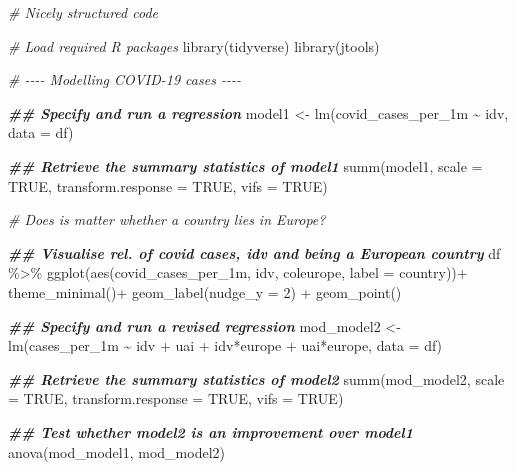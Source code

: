\documentclass[
]{book}
\newenvironment{Shaded}{\begin{snugshade}}{\end{snugshade}}
\newcommand{\AttributeTok}[1]{\textcolor[rgb]{0.77,0.63,0.00}{#1}}
\newcommand{\CommentTok}[1]{\textcolor[rgb]{0.56,0.35,0.01}{\textit{#1}}}
\newcommand{\ConstantTok}[1]{\textcolor[rgb]{0.00,0.00,0.00}{#1}}
\newcommand{\DecValTok}[1]{\textcolor[rgb]{0.00,0.00,0.81}{#1}}
\newcommand{\DocumentationTok}[1]{\textcolor[rgb]{0.56,0.35,0.01}{\textbf{\textit{#1}}}}
\newcommand{\FunctionTok}[1]{\textcolor[rgb]{0.00,0.00,0.00}{#1}}
\newcommand{\NormalTok}[1]{#1}
\newcommand{\OtherTok}[1]{\textcolor[rgb]{0.56,0.35,0.01}{#1}}
\newcommand{\SpecialCharTok}[1]{\textcolor[rgb]{0.00,0.00,0.00}{#1}}
\begin{document}
\begin{Shaded}
\begin{Highlighting}[]
\CommentTok{\# Nicely structured code}

\CommentTok{\# Load required R packages}
\FunctionTok{library}\NormalTok{(tidyverse)}
\FunctionTok{library}\NormalTok{(jtools)}

\CommentTok{\# {-}{-}{-}{-} Modelling COVID{-}19 cases {-}{-}{-}{-}}

\DocumentationTok{\#\# Specify and run a regression}
\NormalTok{model1 }\OtherTok{\textless{}{-}} \FunctionTok{lm}\NormalTok{(covid\_cases\_per\_1m }\SpecialCharTok{\textasciitilde{}}\NormalTok{ idv, }\AttributeTok{data =}\NormalTok{ df)}

\DocumentationTok{\#\# Retrieve the summary statistics of model1}
\FunctionTok{summ}\NormalTok{(model1, }\AttributeTok{scale =} \ConstantTok{TRUE}\NormalTok{, }\AttributeTok{transform.response =} \ConstantTok{TRUE}\NormalTok{, }\AttributeTok{vifs =} \ConstantTok{TRUE}\NormalTok{)}

\CommentTok{\# Does is matter whether a country lies in Europe?}

\DocumentationTok{\#\# Visualise rel. of covid cases, idv and being a European country}
\NormalTok{df }\SpecialCharTok{\%\textgreater{}\%}
  \FunctionTok{ggplot}\NormalTok{(}\FunctionTok{aes}\NormalTok{(covid\_cases\_per\_1m, idv, coleurope, }\AttributeTok{label =}\NormalTok{ country))}\SpecialCharTok{+}
  \FunctionTok{theme\_minimal}\NormalTok{()}\SpecialCharTok{+}
  \FunctionTok{geom\_label}\NormalTok{(}\AttributeTok{nudge\_y =} \DecValTok{2}\NormalTok{) }\SpecialCharTok{+}
  \FunctionTok{geom\_point}\NormalTok{()}

\DocumentationTok{\#\# Specify and run a revised regression}
\NormalTok{mod\_model2 }\OtherTok{\textless{}{-}} \FunctionTok{lm}\NormalTok{(cases\_per\_1m }\SpecialCharTok{\textasciitilde{}}\NormalTok{ idv }\SpecialCharTok{+}\NormalTok{ uai }\SpecialCharTok{+}\NormalTok{ idv}\SpecialCharTok{*}\NormalTok{europe }\SpecialCharTok{+}\NormalTok{ uai}\SpecialCharTok{*}\NormalTok{europe, }\AttributeTok{data =}\NormalTok{ df)}

\DocumentationTok{\#\# Retrieve the summary statistics of model2}
\FunctionTok{summ}\NormalTok{(mod\_model2, }\AttributeTok{scale =} \ConstantTok{TRUE}\NormalTok{, }\AttributeTok{transform.response =} \ConstantTok{TRUE}\NormalTok{, }\AttributeTok{vifs =} \ConstantTok{TRUE}\NormalTok{)}

\DocumentationTok{\#\# Test whether model2 is an improvement over model1}
\FunctionTok{anova}\NormalTok{(mod\_model1, mod\_model2)}
\end{Highlighting}
\end{Shaded}
\end{document}
